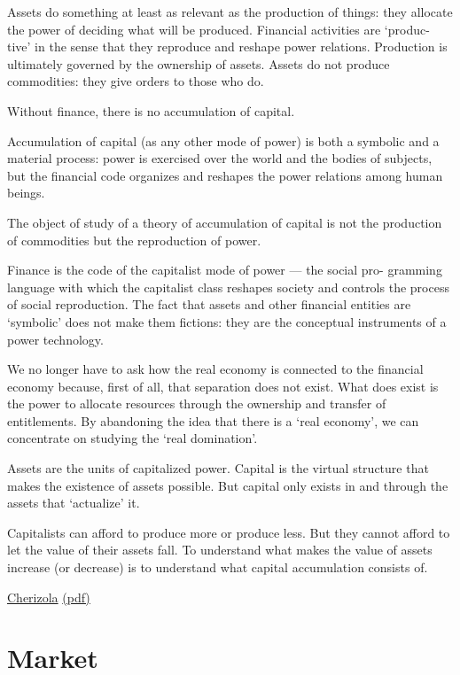 \documentclass[
]{book}
\begin{document}
Assets do something at least as relevant as the production of things: they allocate
the power of deciding what will be produced. Financial activities are `produc-
tive' in the sense that they reproduce and reshape power relations.
Production is ultimately governed by the ownership of assets.
Assets do not produce commodities: they give orders to those who do.

Without finance, there is no accumulation of capital.

Accumulation of capital (as any other mode of power) is both a symbolic
and a material process: power is exercised over the world and the bodies of
subjects, but the financial code organizes and reshapes the power relations
among human beings.

The object of study of a theory of accumulation of capital is not the
production of commodities but the reproduction of power.

Finance is the code of the capitalist mode of power --- the social pro-
gramming language with which the capitalist class reshapes society and
controls the process of social reproduction. The fact that assets and other
financial entities are `symbolic' does not make them fictions: they are
the conceptual instruments of a power technology.

We no longer have to ask
how the real economy is connected to the financial economy because,
first of all, that separation does not exist. What does exist is the power
to allocate resources through the ownership and transfer of entitlements.
By abandoning the idea that there is a `real economy', we can concentrate
on studying the `real domination'.

Assets are the units of capitalized power. Capital is the virtual structure
that makes the existence of assets possible. But capital only exists in and
through the assets that `actualize' it.

Capitalists can afford to produce more or produce less. But they cannot
afford to let the value of their assets fall. To understand what makes
the value of assets increase (or decrease) is to understand what capital
accumulation consists of.

\href{https://capitalaspower.com/2021/05/cherizola-from-commodities-to-assets/}{Cherizola}
\href{pdf/Cherizola_2021_Commodities_Assets.pdf}{(pdf)}

\hypertarget{market}{%
\chapter{Market}\label{market}}
\end{document}
